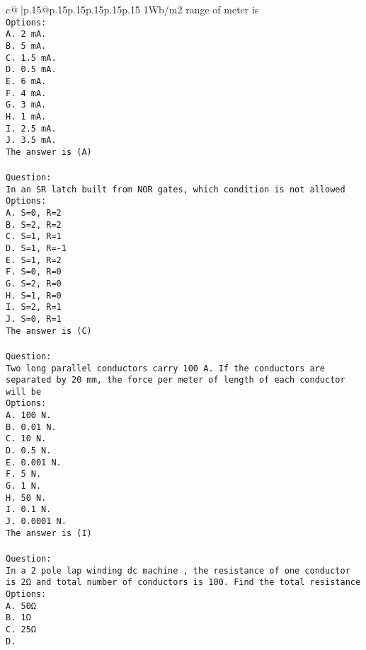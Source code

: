\documentclass{article}
\begin{document}
{\begin{supertabular}{c@{$\;$}|p{.15\linewidth}@{}p{.15\linewidth}p{.15\linewidth}p{.15\linewidth}p{.15\linewidth}p{.15\linewidth}}
{{{1Wb/m2 range of meter is\\ \tt Options:\\ \tt A. 2 mA.\\ \tt B. 5 mA.\\ \tt C. 1.5 mA.\\ \tt D. 0.5 mA.\\ \tt E. 6 mA.\\ \tt F. 4 mA.\\ \tt G. 3 mA.\\ \tt H. 1 mA.\\ \tt I. 2.5 mA.\\ \tt J. 3.5 mA.\\ \tt The answer is (A)\\ \tt \\ \tt Question:\\ \tt In an SR latch built from NOR gates, which condition is not allowed\\ \tt Options:\\ \tt A. S=0, R=2\\ \tt B. S=2, R=2\\ \tt C. S=1, R=1\\ \tt D. S=1, R=-1\\ \tt E. S=1, R=2\\ \tt F. S=0, R=0\\ \tt G. S=2, R=0\\ \tt H. S=1, R=0\\ \tt I. S=2, R=1\\ \tt J. S=0, R=1\\ \tt The answer is (C)\\ \tt \\ \tt Question:\\ \tt Two long parallel conductors carry 100 A. If the conductors are separated by 20 mm, the force per meter of length of each conductor will be\\ \tt Options:\\ \tt A. 100 N.\\ \tt B. 0.01 N.\\ \tt C. 10 N.\\ \tt D. 0.5 N.\\ \tt E. 0.001 N.\\ \tt F. 5 N.\\ \tt G. 1 N.\\ \tt H. 50 N.\\ \tt I. 0.1 N.\\ \tt J. 0.0001 N.\\ \tt The answer is (I)\\ \tt \\ \tt Question:\\ \tt In a 2 pole lap winding dc machine , the resistance of one conductor is 2Ω and total number of conductors is 100. Find the total resistance\\ \tt Options:\\ \tt A. 50Ω\\ \tt B. 1Ω\\ \tt C. 25Ω\\ \tt D. }}}
\end{supertabular}}
\end{document}
